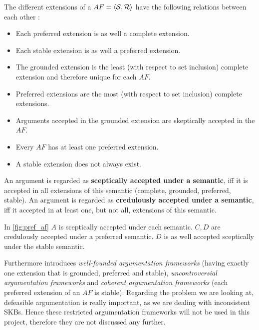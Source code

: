 \begin{remark}
The different extensions of a $AF = \langle \mathcal{S}, \mathcal{R} \rangle$ have the following relations between each other \cite{dung1995}:
\begin{itemize} 
	\item Each preferred extension is as well a complete extension.
	\item Each stable extension is as well a preferred extension.
	\item The grounded extension is the least (with respect to set inclusion) complete extension and therefore unique for each $AF$.
	\item Preferred extensions are the most (with respect to set inclusion) complete extensions.
	\item Arguments accepted in the grounded extension are skeptically accepted in the $AF$.
	\item Every $AF$ has at least one preferred extension.
	\item A stable extension does not always exist.
\end{itemize}
\end{remark}


\begin{definition}	
	An argument is regarded as \textbf{sceptically accepted under a semantic}, iff it is accepted in all extensions of this semantic (complete, grounded, preferred, stable). An argument is regarded as \textbf{credulously accepted under a semantic}, iff it accepted in at least one, but not all, extensions of this semantic. 	
\end{definition}

\begin{exa}
	In \autoref{fig:pref_af} $A$ is sceptically accepted under each semantic. $C, D$ are credulously accepted under a preferred semantic. $D$ is as well accepted sceptically under the stable semantic.
\end{exa}


Furthermore \cite{dung1995} introduces \textit{well-founded argumentation frameworks} (having exactly one extension that is grounded, preferred and stable), \textit{uncontroversial argumentation frameworks} and \textit{coherent argumentation frameworks} (each preferred extension of an $AF$ is stable). Regarding the problem we are looking at, defeasible argumentation is really important, as we are dealing with inconsistent \glspl{SKB}. Hence these restricted argumentation frameworks will not be used in this project, therefore they are not discussed any further.


